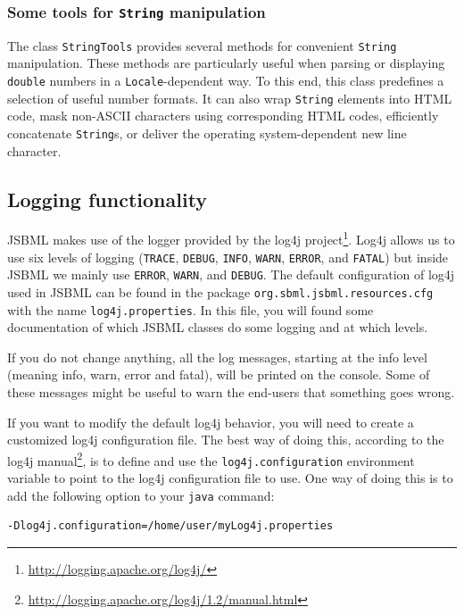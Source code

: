 \subsubsection{Some tools for \texttt{String} manipulation}

The class \texttt{StringTools}
%
provides several methods for convenient \texttt{String} manipulation. These
methods are particularly useful when parsing or displaying \texttt{double}
numbers in a \texttt{Locale}\hyp{}dependent way. To this end, this class
predefines a selection of useful number formats. It can also wrap
\texttt{String} elements into HTML code, mask non-ASCII characters using
corresponding HTML codes, efficiently concatenate \texttt{String}s, or deliver
the operating system\hyp{}dependent new line character.


\subsection{Logging functionality}
%

JSBML makes use of the logger provided by the log4j
project\footnote{\url{http://logging.apache.org/log4j/}}.
Log4j allows us to use six levels
of logging (\texttt{TRACE}, \texttt{DEBUG},
\texttt{INFO}, \texttt{WARN}, \texttt{ERROR}, and \texttt{FATAL}) but inside
JSBML we mainly use \texttt{ERROR}, \texttt{WARN}, and \texttt{DEBUG}. The
default configuration of log4j used in JSBML can be found in the package
\texttt{org.sbml.jsbml.resources.cfg} with the name \texttt{log4j.properties}.
In this file, you will found some documentation of which JSBML classes do some 
logging and at which levels. 
 
If you do not change anything, all the log messages, starting at the info level 
(meaning info, warn, error and fatal), will be printed on the console.
Some of these messages might be useful to warn the end-users that something
goes wrong.


If you want to modify the default log4j behavior, you will need to create a
customized log4j configuration file. The best way of doing this, according to
the log4j
manual\footnote{\url{http://logging.apache.org/log4j/1.2/manual.html}}, is to
define and use the \texttt{log4j.configuration} environment variable to point to
the log4j configuration file to use. One way of doing this is to add the
following option to your \texttt{java} command:
\begin{lstlisting}[language=bash,numbers=none,captionpos=t]
-Dlog4j.configuration=/home/user/myLog4j.properties
\end{lstlisting}

